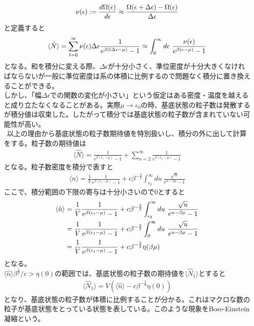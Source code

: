 \documentclass{jsarticle}  %
\numberwithin{equation}{section} %
\numberwithin{figure}{section}
\begin{document}
    \begin{align}
        \nu (\epsilon) := \frac{d\Omega(\epsilon) }{d \epsilon} \approx \frac {\Omega (\epsilon + \Delta \epsilon) - \Omega (\epsilon) }{\Delta \epsilon} \notag 
    \end{align}
    と定義すると
    \begin{align}
        \langle \hat{N} \rangle = \sum_{l=0}^{\infty} \nu (\epsilon) \Delta \epsilon   \frac{1}{e^{\beta (l\Delta \epsilon - \mu)} - 1} \approx \int_0^{\infty} d\epsilon\ \frac{\nu (\epsilon)}{e^{\beta (\epsilon - \mu)} - 1} \notag 
    \end{align}
    となる。和を積分に変える際、$\Delta \epsilon$が十分小さく、準位密度が十分大きくなければならないが一般に準位密度は系の体積に比例するので問題なく積分に置き換えることができる。\\
    しかし、「幅$\Delta \epsilon$での関数の変化が小さい」という仮定はある密度・温度を越えると成り立たなくなることがある。実際$\mu \rightarrow \epsilon_0$の時、基底状態の粒子数は発散するが積分値は収束した。したがって積分では基底状態の粒子数が含まれていない可能性が高い。\\
    $\ \ $以上の理由から基底状態の粒子数期待値を特別扱いし、積分の外に出して計算をする。粒子数の期待値は
    \begin{align}
        \langle \hat{N} \rangle = \frac{1}{e^{\beta (\epsilon_1 - \mu)} - 1} + \sum_{n=2}^{\infty} \frac{1}{e^{\beta (\epsilon_n - \mu)} - 1}
    \end{align}
    となる。粒子数密度を積分で表すと
    \begin{align}
        \langle \hat{n} \rangle = \frac{1}{V} \frac{1}{e^{\beta (\epsilon_1 - \mu)} - 1} + c \beta^{-\frac{3}{2}}\int_{\epsilon_2}^{\infty} du\ \frac{\sqrt{u}}{e^{u - \beta \mu} - 1}
    \end{align}
    ここで、積分範囲の下限の寄与は十分小さいので$0$とすると
    \begin{align}
        \langle \hat{n} \rangle &= \frac{1}{V} \frac{1}{e^{\beta (\epsilon_1 - \mu)} - 1} + c \beta^{-\frac{3}{2}}\int_{\epsilon_2}^{\infty} du\ \frac{\sqrt{u}}{e^{u - \beta \mu} - 1} \notag \\
        &= \frac{1}{V} \frac{1}{e^{\beta (\epsilon_1 - \mu)} - 1} + c \beta^{-\frac{3}{2}}\int_{0}^{\infty} du\ \frac{\sqrt{u}}{e^{u - \beta \mu} - 1} \notag \\
        &= \frac{1}{V} \frac{1}{e^{\beta (\epsilon_1 - \mu)} - 1} + c \beta^{-\frac{3}{2}} \eta (\beta \mu)
    \end{align}
    となる。\\
    $\langle \hat{n} \rangle \beta^{\frac{3}{2}} / c> \eta (0)$の範囲では、基底状態の粒子数の期待値を$\langle \hat{N}_1 \rangle$とすると
    \begin{align}
        \langle \hat{N}_1 \rangle = V \left( \langle \hat{n} \rangle - c \beta^{-\frac{3}{2}} \eta (0) \right)
    \end{align}
    となり、基底状態の粒子数が体積に比例することが分かる。これはマクロな数の粒子が基底状態をとっている状態を表している。このような現象をBose-Einstein凝縮という。
\end{document}
